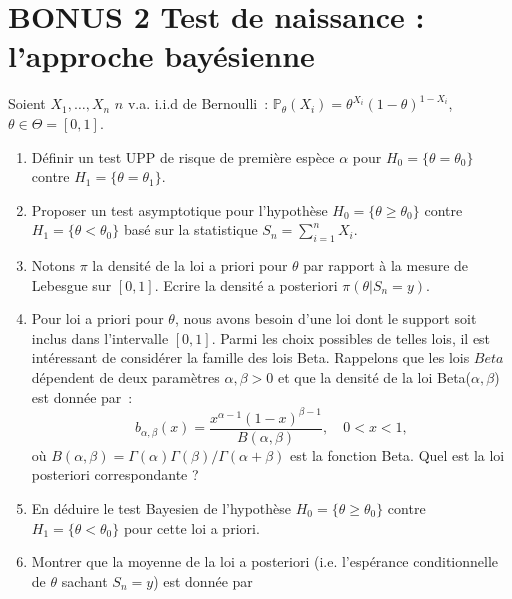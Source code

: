 \documentclass[a4paper,11pt,fleqn]{article}
\newcommand{\1}{\ensuremath{\mathbbm{1}}}
\begin{document}
\section{BONUS 2 Test de naissance : l'approche bay\'esienne}
\label{exo:NaissancesLoiBeta}
Soient $X_1, \ldots, X_n$ $n$ v.a. i.i.d de Bernoulli~: $\mathbb{P}_\theta( X_i ) = \theta^{X_i} (1 - \theta)^{1 - X_i}$,
$\theta \in \Theta= [0,1]$.
\begin{enumerate}
\item D\'efinir un test UPP de risque de premi\`ere esp\`ece $\alpha$ pour $H_0=\{\theta=\theta_0\}$ contre
 $H_1=\{\theta=\theta_1\}$.
\item Proposer un test asymptotique pour l'hypoth\`ese $H_0=\{\theta\geq\theta_0\}$ contre $H_1=\{\theta<\theta_0\}$ bas\'e sur
la statistique $S_n=\sum_{i=1}^nX_i$.
\item Notons $\pi$ la densit\'e de la loi a priori pour $\theta$ par rapport \`a la mesure
de Lebesgue sur $[0,1]$. Ecrire la densit\'e a posteriori $\pi( \theta \vert S_n=y)$.
\item Pour loi a priori pour $\theta$, nous avons besoin d'une loi dont le support soit inclus dans l'intervalle $[0,1]$.
Parmi les choix possibles de telles lois, il est int\'eressant de consid\'erer la famille des lois Beta. Rappelons
que les lois $Beta$ d\'ependent de deux param\`etres $\alpha,\beta>0$ et que la densit\'e de la loi Beta($\alpha,\beta$)
est donn\'ee par~:
\[                                                                                                                                                                                                                                                                                                                             
b_{\alpha,\beta}(x)= \frac{x^{\alpha-1} (1- x)^{\beta-1}}{B(\alpha,\beta)}, \quad 0 < x < 1,                                                                                                                                                                                                                                   
\]
o\`u $B(\alpha,\beta) = \Gamma(\alpha) \Gamma(\beta) / \Gamma(\alpha+\beta)$ est la fonction Beta. Quel est la loi posteriori
correspondante ?
\item En d\'eduire le test Bayesien de l'hypoth\`ese $H_0=\{\theta\geq\theta_0\}$ contre $H_1=\{\theta<\theta_0\}$ pour cette loi
  a priori.
\item  Montrer que la moyenne de la loi a posteriori (i.e. l'esp\'erance conditionnelle de $\theta$ sachant $S_n = y$) est donn\'ee par

\end{enumerate}
\end{document}
